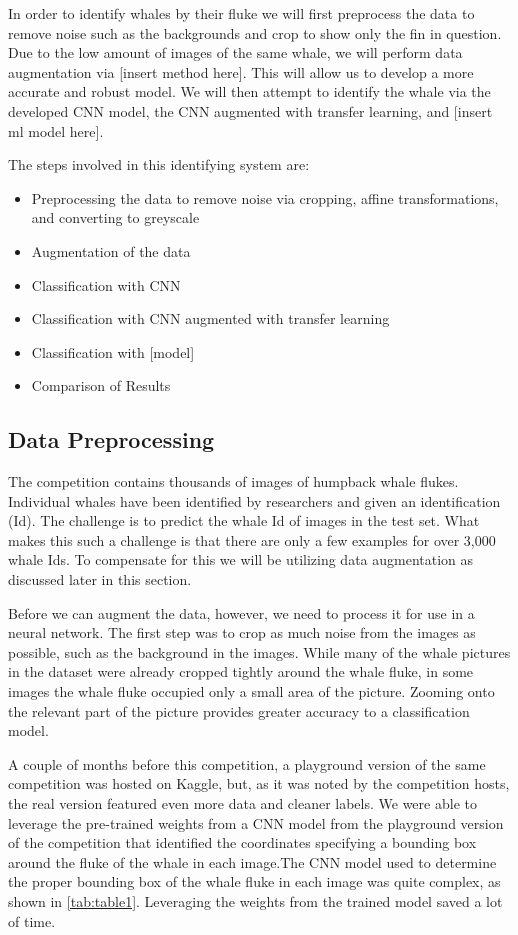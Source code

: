 \documentclass[paper=a4, fontsize=11pt]{scrartcl}
\numberwithin{equation}{section}		%
\numberwithin{table}{section}				%
\begin{document}

In order to identify whales by their fluke we will first preprocess the data to remove noise such as the backgrounds and crop to show only the fin in question. Due to the low amount of images of the same whale, we will perform data augmentation via [insert method here]. This will allow us to develop a more accurate and robust model. We will then attempt to identify the whale via the developed CNN model, the CNN augmented with transfer learning, and [insert ml model here].

The steps involved in this identifying system are:
\begin{itemize}
    \item Preprocessing the data to remove noise via cropping, affine transformations, and converting to greyscale
    \item Augmentation of the data
    \item Classification with CNN
    \item Classification with CNN augmented with transfer learning
    \item Classification with [model]
    \item Comparison of Results
\end{itemize}

\subsection{Data Preprocessing}

The competition contains thousands of images of humpback whale flukes. Individual whales have been identified by researchers and given an identification (Id). The challenge is to predict the whale Id of images in the test set. What makes this such a challenge is that there are only a few examples for over 3,000 whale Ids. To compensate for this we will be utilizing data augmentation as discussed later in this section. 

Before we can augment the data, however, we need to process it for use in a neural network. The first step was to crop as much noise from the images as possible, such as the background in the images. While many of the whale pictures in the dataset were already cropped tightly around the whale fluke, in some images the whale fluke occupied only a small area of the picture. Zooming onto the relevant part of the picture provides greater accuracy to a classification model. 

A couple of months before this competition, a playground version of the same competition was hosted on Kaggle, but, as it was noted by the competition hosts, the real version featured even more data and cleaner labels. We were able to leverage the pre-trained weights from a CNN model from the playground version of the competition that identified the coordinates specifying a bounding box around the fluke of the whale in each image.The CNN model used to determine the proper bounding box of the whale fluke in each image was quite complex, as shown in \autoref{tab:table1}. Leveraging the weights from the trained model saved a lot of time.
\end{document}
